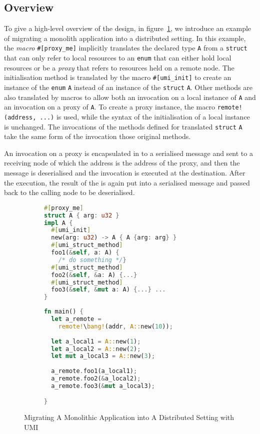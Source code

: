 \subsection{Overview}
\label{chap3:impl:overview}
To give a high-level overview of the design, in figure~\ref{chap3:impl:overview:fig}, we introduce an example of migrating a monolith application into a distributed setting. In this example, the \emph{macro} \texttt{\#[proxy\_me]} implicitly translates the declared type \texttt{A} from a \texttt{struct} that can only refer to local resources to an \texttt{enum} that can either hold local resources or be a \emph{proxy} that refers to resources held on a remote node. The initialisation method is translated by the macro \texttt{\#[umi\_init]} to create an instance of the \texttt{enum} \texttt{A} instead of an instance of the \texttt{struct} \texttt{A}. Other methods are also translated by macros to allow both an invocation on a local instance of \texttt{A} and an invocation on a proxy of \texttt{A}. To create a proxy instance, the macro \texttt{remote!(address, ...)} is used, while the syntax of the initialisation of a local instance is unchanged. The invocations of the methods defined for translated \texttt{struct} \texttt{A} take the same form of the invocation those original methods.

An invocation on a proxy is encapsulated in to a serialised message and sent to a receiving node of which the address is the address of the proxy, and then the message is deserialised and the invocation is executed at the destination. After the execution, the result of the is again put into a serialised message and passed back to the calling node to be deserialised.
\begin{figure}[t]
\centering
\begin{subfigure}[t]{0.53\textwidth}
    \centering
\begin{lstlisting}[language=Rust, style=boxed]
#[proxy_me]
struct A { arg: u32 }
impl A {
  #[umi_init]
  new(arg: u32) -> A { A {arg: arg} }
  #[umi_struct_method]
  foo1(&self, a: A) {
    /* do something */}
  #[umi_struct_method]
  foo2(&self, &a: A) {...}
  #[umi_struct_method]
  foo3(&self, &mut a: A) {...} ...
}
\end{lstlisting}
\end{subfigure}
\hfill
\begin{subfigure}[t]{0.45\textwidth}
    \centering
\begin{lstlisting}[language=Rust, style=boxed]
fn main() {
  let a_remote = 
    remote!\bang!(addr, A::new(10));
  
  let a_local1 = A::new(1);
  let a_local2 = A::new(2);
  let mut a_local3 = A::new(3);
  
  a_remote.foo1(a_local1);
  a_remote.foo2(&a_local2);
  a_remote.foo3(&mut a_local3);

}
\end{lstlisting}
\end{subfigure}
\vspace{1em}
\caption{Migrating A Monolithic Application into A Distributed Setting with UMI}
\label{chap3:impl:overview:fig}
\end{figure}

